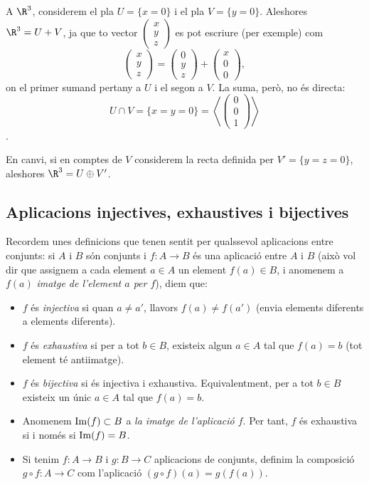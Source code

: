 \begin{exemple}
    A $\R^3$, considerem el pla $U=\{x=0\}$ i el pla $V=\{y = 0 \}$. Aleshores $\R^3 = U + V$, ja que to vector $\begin{pmatrix}x\\y\\z\end{pmatrix}$ es pot escriure (per exemple) com
    \[
    \begin{pmatrix}
    x\\y\\z
    \end{pmatrix}=
    \begin{pmatrix}
    0\\y\\z
    \end{pmatrix}+
    \begin{pmatrix}
    x\\0\\0
    \end{pmatrix},
    \]
    on el primer sumand pertany a $U$ i el segon a $V$. La suma, però, no és directa: $$U\cap V=\{x=y=0\}=\left\langle \begin{pmatrix}0\\0\\1\end{pmatrix}\right\rangle$$.
    
    En canvi, si en comptes de $V$ considerem la recta definida per $V'=\{y=z=0\}$, aleshores $\R^3=U\oplus V'$.
\end{exemple}

\subsection{Aplicacions injectives, exhaustives i bijectives}
Recordem unes definicions que tenen sentit per qualssevol aplicacions entre conjunts: si $A$ i $B$ són conjunts i $f\colon A \to B$ és una aplicació entre $A$ i $B$ (això vol dir que assignem a cada element $a\in A$ un element $f(a)\in B$, i anomenem a $f(a)$ \emph{imatge de l'element $a$ per $f$}), diem que:
\begin{itemize}
	\item $f$ és \emph{injectiva} si quan $a\neq a'$, llavors $f(a)\neq f(a')$ (envia elements diferents a elements diferents).
	\item $f$ és \emph{exhaustiva} si per a tot $b\in B$, existeix algun $a\in A$ tal que $f(a)=b$ (tot element té antiimatge).
	\item $f$ és \emph{bijectiva} si és injectiva i exhaustiva. Equivalentment, per a tot $b\in B$ existeix un únic $a\in A$ tal que $f(a)=b$.
	\item Anomenem $\operatorname{Im}(f)\subset B$ a \emph{la imatge de l'aplicació $f$}. Per tant, $f$ és exhaustiva si i només si $\operatorname{Im}(f)=B$.
	\item Si tenim $f\colon A \to B$ i $g\colon B \to C$ aplicacions de conjunts, definim la composició $g\circ f \colon A \to C$ com l'aplicació $(g\circ f)(a)=g(f(a))$.
\end{itemize}

